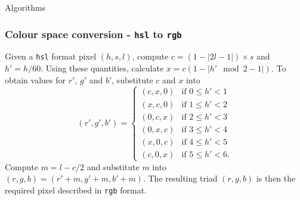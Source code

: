 \begin{chapter}{\label{app:algorithms}Algorithms}
\subsubsection{Colour space conversion - {\tt hsl} to {\tt rgb}}
Given a {\tt hsl} format pixel $(h,s,l)$, compute $c = (1 - | 2l - 1|) \times s$ and $h' = h/60$. Using these quantities, calculate $x = c(1-|h' \mod 2 - 1|)$. To obtain values for $r'$, $g'$ and $b'$, substitute $c$ and $x$ into
\begin{equation}
(r', g', b') =
    \begin{cases}
      (c, x, 0) &\mbox{if } 0 \leq h' < 1 \\
      (x, c, 0) &\mbox{if } 1 \leq h' < 2 \\
      (0, c, x) &\mbox{if } 2 \leq h' < 3 \\
      (0, x, c) &\mbox{if } 3 \leq h' < 4 \\
      (x, 0, c) &\mbox{if } 4 \leq h' < 5 \\
      (c, 0, x) &\mbox{if } 5 \leq h'< 6.
    \end{cases}
\end{equation}
Compute $m = l - c/2$ and substitute $m$ into $(r,g,b) = (r'+m,g'+m,b'+m)$. The resulting triad $(r,g,b)$ is then the required pixel described in {\tt rgb} format.


\end{chapter}
